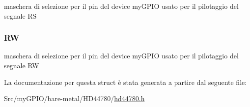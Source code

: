 maschera di selezione per il pin del device my\+G\+P\+I\+O usato per il pilotaggio del segnale R\+S \hypertarget{struct_h_d44780___l_c_d__t_af404868fc36134454144950be4977d95}{
\subsubsection[{R\+W}]{ R\+W}}\label{struct_h_d44780___l_c_d__t_af404868fc36134454144950be4977d95}
maschera di selezione per il pin del device my\+G\+P\+I\+O usato per il pilotaggio del segnale R\+W 

La documentazione per questa struct è stata generata a partire dal seguente file\+:\begin{DoxyCompactItemize}
\item 
Src/my\+G\+P\+I\+O/bare-\/metal/\+H\+D44780/\hyperlink{hd44780_8h}{hd44780.\+h}\end{DoxyCompactItemize}
